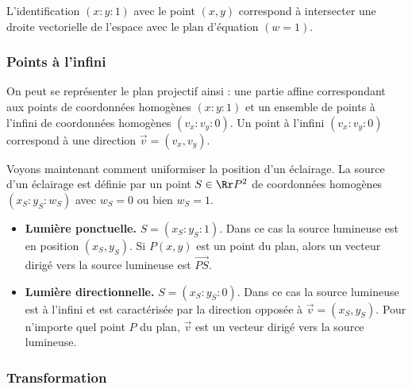 \documentclass[11pt,class=report,crop=false]{standalone}
\begin{document}
L'identification $(x:y:1)$ avec le point $(x,y)$ correspond à intersecter une droite vectorielle de l'espace avec le plan d'équation $(w=1)$.


\subsubsection{Points à l'infini}

On peut se représenter le plan projectif ainsi : une partie affine correspondant 
aux points de coordonnées homogènes $(x:y:1)$ et un ensemble de points à l'infini de coordonnées homogènes $(v_x:v_y:0)$. Un point à l'infini $(v_x:v_y:0)$ correspond à une direction $\vec v =  (v_x,v_y)$.


Voyons maintenant comment uniformiser la position d'un éclairage.
La source d'un éclairage est définie par un point $S \in \Rr P^2$ de coordonnées homogènes $(x_S:y_S:w_S)$ avec $w_S=0$ ou bien $w_S=1$.

\begin{itemize}
	\item \textbf{Lumière ponctuelle.} $S = (x_S:y_S:1)$. Dans ce cas la source lumineuse est en position $(x_S,y_S)$. Si $P(x,y)$ est un point du plan, alors un vecteur dirigé vers la source lumineuse est $\vec{PS}$.
	
	\item \textbf{Lumière directionnelle.} $S = (x_S:y_S:0)$. Dans ce cas la source lumineuse est \og{}à l'infini\fg{} et est caractérisée par la direction opposée à $\vec v =  (x_S,y_S)$. Pour n'importe quel point $P$ du plan, $\vec v$ est un vecteur dirigé vers la source lumineuse.
\end{itemize}

\begin{center}
\begin{minipage}{0.45\textwidth}
\end{minipage} \quad	
\begin{minipage}{0.45\textwidth}
\end{minipage}
\end{center}



\subsubsection{Transformation}
\end{document}
